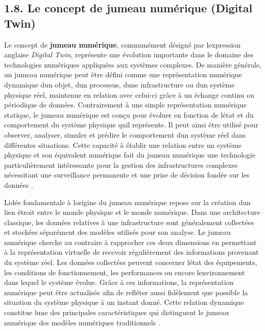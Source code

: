 \documentclass[12pt,a4paper,oneside]{report}
\begin{document}
\subsection{1.8. Le concept de jumeau numérique (Digital
Twin)}\label{le-concept-de-jumeau-numuxe9rique-digital-twin}

Le concept de \textbf{jumeau numérique}, communément désigné par
l\textquotesingle expression anglaise \emph{Digital Twin}, représente
une évolution importante dans le domaine des technologies numériques
appliquées aux systèmes complexes. De manière générale, un jumeau
numérique peut être défini comme une représentation numérique dynamique
d\textquotesingle un objet, d\textquotesingle un processus,
d\textquotesingle une infrastructure ou d\textquotesingle un système
physique réel, maintenue en relation avec celui-ci grâce à un échange
continu ou périodique de données. Contrairement à une simple
représentation numérique statique, le jumeau numérique est conçu pour
évoluer en fonction de l\textquotesingle état et du comportement du
système physique qu\textquotesingle il représente. Il peut ainsi être
utilisé pour observer, analyser, simuler et prédire le comportement
d\textquotesingle un système réel dans différentes situations. Cette
capacité à établir une relation entre un système physique et son
équivalent numérique fait du jumeau numérique une technologie
particulièrement intéressante pour la gestion des infrastructures
complexes nécessitant une surveillance permanente et une prise de
décision fondée sur les données \cite{ref8}.

L\textquotesingle idée fondamentale à l\textquotesingle origine du
jumeau numérique repose sur la création d\textquotesingle un lien étroit
entre le monde physique et le monde numérique. Dans une architecture
classique, les données relatives à une infrastructure sont généralement
collectées et stockées séparément des modèles utilisés pour son analyse.
Le jumeau numérique cherche au contraire à rapprocher ces deux
dimensions en permettant à la représentation virtuelle de recevoir
régulièrement des informations provenant du système réel. Les données
collectées peuvent concerner l\textquotesingle état des équipements, les
conditions de fonctionnement, les performances ou encore
l\textquotesingle environnement dans lequel le système évolue. Grâce à
ces informations, la représentation numérique peut être actualisée afin
de refléter aussi fidèlement que possible la situation du système
physique à un instant donné. Cette relation dynamique constitue
l\textquotesingle une des principales caractéristiques qui distinguent
le jumeau numérique des modèles numériques traditionnels \cite{ref58}.
\end{document}

